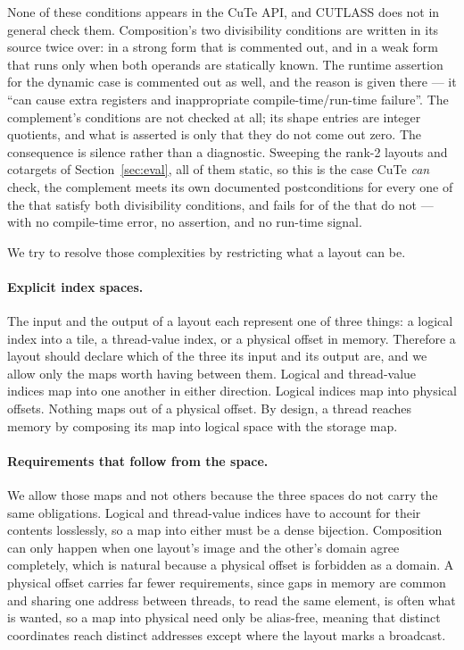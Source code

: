 \documentclass[11pt]{article}
\theoremstyle{definition}
\begin{document}
None of these conditions appears in the CuTe API, and CUTLASS does not in
general check them. Composition's two divisibility conditions are written in
its source twice over: in a strong form that is commented out, and in a weak
form that runs only when both operands are statically known. The runtime
assertion for the dynamic case is commented out as well, and the reason is
given there --- it ``can cause extra registers and inappropriate
compile-time/run-time failure''. The complement's conditions are not checked
at all; its shape entries are integer quotients, and what is asserted is only
that they do not come out zero. The consequence is silence rather than a
diagnostic. Sweeping the \cuteCompTotal{} rank-2 layouts and cotargets of
Section~\ref{sec:eval}, all of them static, so this is the case CuTe
\emph{can} check, the complement meets its own documented postconditions for
every one of the \cuteCompSatisfied{} that satisfy both divisibility
conditions, and fails for \cuteCompViolatedBroken{} of the
\cuteCompViolated{} that do not --- with no compile-time error, no assertion,
and no run-time signal.

We try to resolve those complexities by restricting what a layout can be.

\paragraph{Explicit index spaces.} The input and the output of a layout each
represent one of three things: a logical index into a tile, a thread-value
index, or a physical offset in memory. Therefore a layout should declare which of the three its
input and its output are, and we allow only the maps worth having between them.
Logical and thread-value indices map into one another in either direction.
Logical indices map into physical offsets. Nothing maps out of a physical
offset. By design, a thread reaches memory by composing its map into logical
space with the storage map.

\paragraph{Requirements that follow from the space.} We allow those maps and
not others because the three spaces do not carry the same obligations. Logical
and thread-value indices have to account for their contents losslessly, so a
map into either must be a dense bijection. Composition can only happen when one
layout's image and the other's domain agree completely, which is natural
because a physical offset is forbidden as a domain. A physical offset carries
far fewer requirements, since gaps in memory are common and sharing one address
between threads, to read the same element, is often what is wanted, so a map
into physical need only be alias-free, meaning that distinct coordinates reach
distinct addresses except where the layout marks a broadcast.
\end{document}
